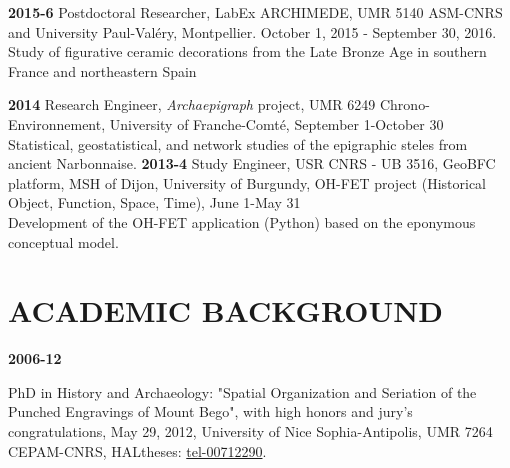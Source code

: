 \documentclass{article}
\newcommand{\fr}[1]{}       %
\newcommand{\en}[1]{#1}     %
\begin{document}
\smallbreak
\textbf{2015-6} \fr{Chercheur postdoctoral, LabEx ARCHIMEDE, UMR 5140 ASM-CNRS et Université Paul-Valéry, Montpellier. 1 octobre 2015 - 30 septembre 2016.} \en{Postdoctoral Researcher, LabEx ARCHIMEDE, UMR 5140 ASM-CNRS and University Paul-Valéry, Montpellier. October 1, 2015 - September 30, 2016.} \\
\hspace*{0.5cm} \fr{Étude des décors figuratifs en céramique de l'Âge du Bronze final dans le sud de la France et le nord-est de l'Espagne} \en{Study of figurative ceramic decorations from the Late Bronze Age in southern France and northeastern Spain}



\smallbreak
\textbf{2014} \fr{Ingénieur de recherche (IR), projet \textit{Archaepigraph}, UMR 6249 Chrono-Environnement, Université de Franche-Comté, 1er septembre-30 octobre} \en{Research Engineer, \textit{Archaepigraph} project, UMR 6249 Chrono-Environnement, University of Franche-Comté, September 1-October 30} \\
\hspace*{0.5cm} \fr{Étude statistiques, géostatistiques et de réseaux des stèles épigraphiques de la Narbonnaise antique.} \en{Statistical, geostatistical, and network studies of the epigraphic steles from ancient Narbonnaise.}
\smallbreak
\textbf{2013-4} \fr{Ingénieur d'études (IE), USR CNRS - UB 3516, plateforme GeoBFC, MSH de Dijon, Université de Bourgogne, projet OH-FET (Objet Historique, Fonction, Espace, Temps), 1er juin-31 mai} \en{Study Engineer, USR CNRS - UB 3516, GeoBFC platform, MSH of Dijon, University of Burgundy, OH-FET project (Historical Object, Function, Space, Time), June 1-May 31} \\
\hspace*{0.5cm} \fr{Développement de l'application OH-FET (Python) d'après le modèle conceptuel éponyme.} \en{Development of the OH-FET application (Python) based on the eponymous conceptual model.}




\section{\fr{PARCOURS ACADÉMIQUE}\en{ACADEMIC BACKGROUND}}

\textbf{2006-12} 
\fr{Doctorat en Histoire et Archéologie: "Organisation spatiale et sériation des gravures piquetées du mont Bego", mention très honorable avec les félicitations du jury, 29 mai 2012, Université Nice Sophia-Antipolis, UMR 7264 CEPAM-CNRS, HALtheses: \href{https://tel.archives-ouvertes.fr/tel-00712290}{tel-00712290}.}
\en{PhD in History and Archaeology: "Spatial Organization and Seriation of the Punched Engravings of Mount Bego", with high honors and jury's congratulations, May 29, 2012, University of Nice Sophia-Antipolis, UMR 7264 CEPAM-CNRS, HALtheses: \href{https://tel.archives-ouvertes.fr/tel-00712290}{tel-00712290}.}
\end{document}
